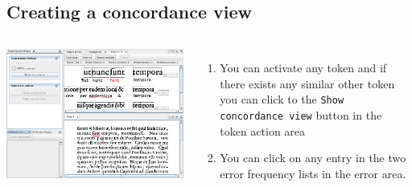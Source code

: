 \subsection{Creating a concordance view}
\begin{frame}
	\begin{columns}
		\includegraphics[width=1.0\textwidth]{../presentations/images/concordanceview1.png}
		\begin{enumerate}
			\item You can activate any token and if there exists any similar other
				token you can click to the \texttt{Show concordance view} button in the
				token action area
			\item You can click on any entry in the two error frequency lists in the
				error area.
		\end{enumerate}
	\end{columns}
\end{frame}

\section{}
\subsection{}
\begin{frame}
\end{frame}


